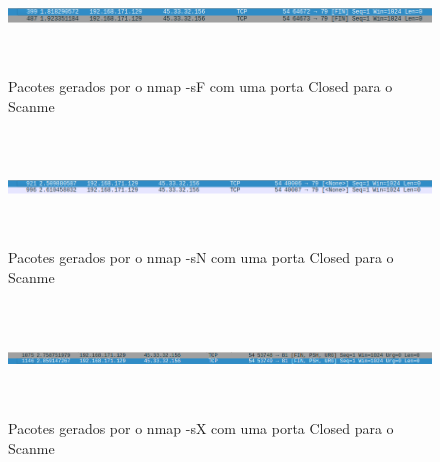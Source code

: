 \begin{figure}[h!]
	\centering
		
	\includegraphics[width=\textwidth,height=3cm,keepaspectratio]{images/nmapsFscanme.png}
		
	\caption{Pacotes gerados por o nmap -sF com uma porta Closed para o Scanme}
		
	\label{fig:nmapsFscanme}
\end{figure}

\begin{figure}[h!]
	\centering
		
	\includegraphics[width=\textwidth,height=3cm,keepaspectratio]{images/nmapsNscanme.png}
		
	\caption{Pacotes gerados por o nmap -sN com uma porta Closed para o Scanme}
		
	\label{fig:nmapsNscanme}
\end{figure}

\begin{figure}[h!]
	\centering
		
	\includegraphics[width=\textwidth,height=3cm,keepaspectratio]{images/nmapsXscanme.png}
		
	\caption{Pacotes gerados por o nmap -sX com uma porta Closed para o Scanme}
		
	\label{fig:nmapsXscanme}
\end{figure}


